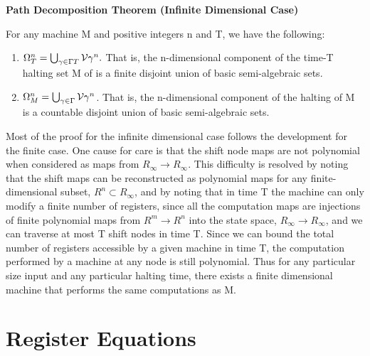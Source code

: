   \begin{theorem}{\textbf{Path Decomposition Theorem (Infinite Dimensional Case)}}
    
    For any machine M and positive integers n and T, we have the
    following:

    \begin{enumerate}
    \item $\Omega_T^n = \bigcup_{\gamma \in \Gamma{T}}
      \mathcal{V}{\gamma}^n.$ That is, the n-dimensional
      component of the time-T halting set M of is a finite disjoint union
      of basic semi-algebraic sets.
    \item $\Omega_M^n = \bigcup_{\gamma \in \Gamma{}}
      \mathcal{V}{\gamma}^n$.  That is, the n-dimensional
      component of the halting of M is a countable disjoint union of
      basic semi-algebraic sets.
      \end{enumerate}
  \end{theorem}

  \begin{proofsketch}
    
    Most of the proof for the infinite dimensional case follows the
    development for the finite case.  One cause for care is that the
    shift node maps are not polynomial when considered as maps from
    $R_\infty \rightarrow R_\infty$.  This difficulty is resolved by
    noting that the shift maps can be reconstructed as polynomial maps
    for any finite-dimensional subset, $R^n \subset R_\infty$, and by
    noting that in time T the machine can only modify a finite number
    of registers, since all the computation maps are injections of
    finite polynomial maps from $R^m \rightarrow R^n$ into the state
    space, $R_\infty \rightarrow R_\infty$, and we can traverse at
    most T shift nodes in time T.  Since we can bound the total number
    of registers accessible by a given machine in time T, the
    computation performed by a machine at any node is still
    polynomial. Thus for any particular size input and any particular
    halting time, there exists a finite dimensional machine that
    performs the same computations as M.
    
  \end{proofsketch}

  \section{Register Equations}

